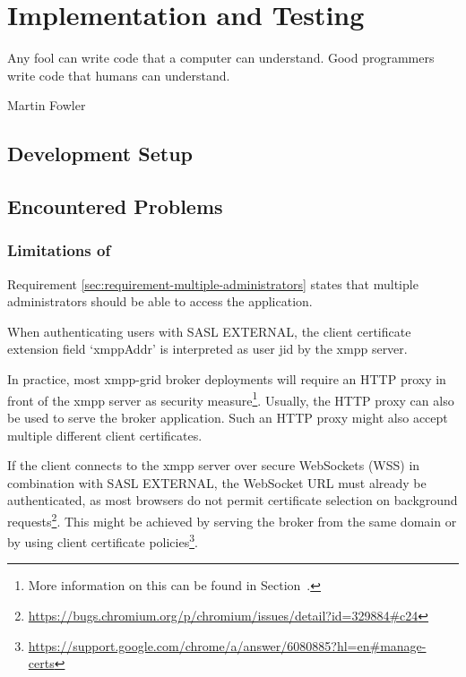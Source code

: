 \chapter{Implementation and Testing} %
\epigraph{Any fool can write code that a computer can understand. Good programmers write code that humans can understand.}{Martin Fowler}


\section{Development Setup}

\section{Encountered Problems}

\subsection{Limitations of \emph{}}\label{sec:limitations-of-requirement-multiple-administrators}

Requirement \ref{sec:requirement-multiple-administrators} states that multiple administrators should be able to access the application.

When authenticating users with SASL EXTERNAL, the client certificate extension field `xmppAddr' is interpreted as user \gls{jid} by the \gls{xmpp} server.

In practice, most \gls{xmpp-grid} \gls{broker} deployments will require an HTTP proxy in front of the \gls{xmpp} server as security measure\footnote{
More information on this can be found in Section~.}.
Usually, the HTTP proxy can also be used to serve the \gls{broker} application.
Such an HTTP proxy might also accept multiple different client certificates.

If the client connects to the \gls{xmpp} server over secure WebSockets (WSS) in combination with SASL EXTERNAL, the WebSocket URL must already be authenticated, as most browsers do not permit certificate selection on background requests\footnote{\url{https://bugs.chromium.org/p/chromium/issues/detail?id=329884\#c24}}.
This might be achieved by serving the \gls{broker} from the same domain or by using client certificate policies\footnote{\url{https://support.google.com/chrome/a/answer/6080885?hl=en\#manage-certs}}.

